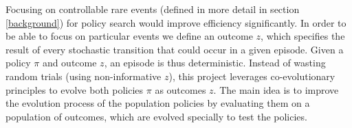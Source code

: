 
Focusing on controllable rare events (defined in more detail in section \ref{background}) for policy search would improve efficiency significantly. In order to be able to focus on particular events we define an outcome $z$, which specifies the result of every stochastic transition that could occur in a given episode. Given a policy $\pi$ and outcome $z$, an episode is thus deterministic. Instead of wasting random trials (using non-informative $z$), this project leverages co-evolutionary principles to evolve both policies $\pi$ as outcomes $z$. The main idea is to improve the evolution process of the population policies by evaluating them on a population of outcomes, which are evolved specially to test the policies.





